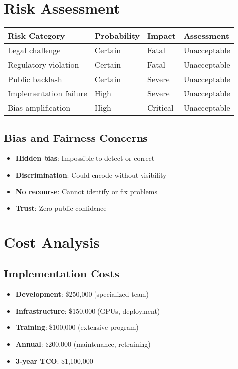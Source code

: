 \section{Risk Assessment}

\begin{center}
\begin{tabular}{llll}
\toprule
Risk Category & Probability & Impact & Assessment \\
\midrule
Legal challenge & Certain & Fatal & Unacceptable \\
Regulatory violation & Certain & Fatal & Unacceptable \\
Public backlash & Certain & Severe & Unacceptable \\
Implementation failure & High & Severe & Unacceptable \\
Bias amplification & High & Critical & Unacceptable \\
\bottomrule
\end{tabular}
\end{center}

\subsection{Bias and Fairness Concerns}

\begin{itemize}
    \item \textbf{Hidden bias}: Impossible to detect or correct
    \item \textbf{Discrimination}: Could encode without visibility
    \item \textbf{No recourse}: Cannot identify or fix problems
    \item \textbf{Trust}: Zero public confidence
\end{itemize}

\section{Cost Analysis}

\subsection{Implementation Costs}

\begin{itemize}
    \item \textbf{Development}: \$250,000 (specialized team)
    \item \textbf{Infrastructure}: \$150,000 (GPUs, deployment)
    \item \textbf{Training}: \$100,000 (extensive program)
    \item \textbf{Annual}: \$200,000 (maintenance, retraining)
    \item \textbf{3-year TCO}: \$1,100,000
\end{itemize}

